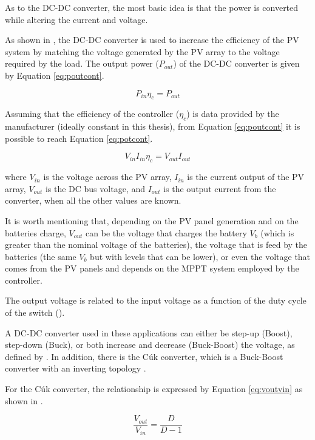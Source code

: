 As to the DC-DC converter, the most basic idea is that the power is converted while altering the current and voltage. 

As shown in \cite{Abdulateef}, the DC-DC converter is used to increase the efficiency of the PV system by matching the voltage generated by the PV array to the voltage required by the load. The output power ($ P_{out} $) of the DC-DC converter is given by Equation \ref{eq:poutcont}. 

\begin{equation}
\label{eq:poutcont}
P_{in} \eta_{c} = P_{out}
\end{equation}

Assuming that the efficiency of the controller ($ \eta_{c} $) is data provided by the manufacturer (ideally constant in this thesis), from Equation \ref{eq:poutcont} it is possible to reach Equation \ref{eq:potcont}.

\begin{equation}
\label{eq:potcont}
V_{in} I_{in} \eta_{c} = V_{out} I_{out}
\end{equation}

\noindent where $ V_{in} $ is the voltage across the PV array, $ I_{in} $ is the current output of the PV array, $ V_{out}$ is the  DC bus voltage, and $I_{out}$ is the output current from the converter, when all the other values are known.

It is worth mentioning that, depending on the PV panel generation and on the batteries charge, $ V_{out}$ can be the voltage that charges the battery $V_{b}$ (which is greater than the nominal voltage of the batteries), the voltage that is feed by the batteries (the same $V_{b}$ but with levels that can be lower), or even the voltage that comes from the PV panels and depends on the MPPT system employed by the controller.

The output voltage is related to the input voltage as a function of the duty cycle of the switch (\cite{Abdulateef}). 
 
A DC-DC converter used in these applications can either be step-up (Boost), step-down (Buck), or both increase and decrease (Buck-Boost) the voltage, as defined by \cite{Mahanta}. In addition, there is the Cúk converter, which is a Buck-Boost converter with an inverting topology \cite{Catherine}. 

For the Cúk converter, the relationship is expressed by Equation \ref{eq:voutvin} as shown in \cite{Abdulateef}.

\begin{equation}
\label{eq:voutvin}
\dfrac{V_{out}}{V_{in}} = \dfrac{D}{D-1}
\end{equation}

